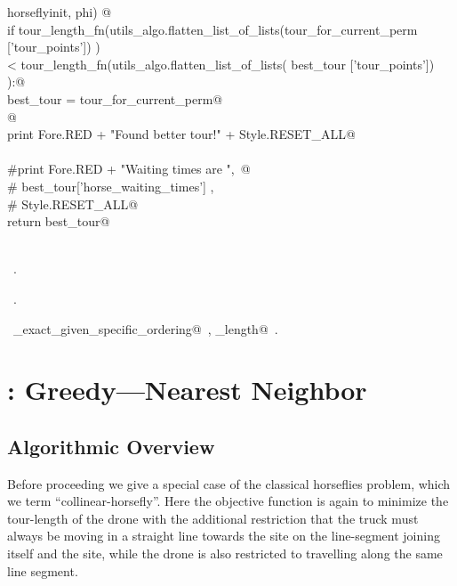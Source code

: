 \documentclass[11.5pt]{report}
\begin{document}
\begin{flushleft}
\begin{minipage}{\linewidth}
\begin{list}{}{}
\mbox{}\verb@                                                                    horseflyinit, phi) @\\
\mbox{}\verb@        if tour_length_fn(utils_algo.flatten_list_of_lists(tour_for_current_perm ['tour_points']) ) \@\\
\mbox{}\verb@         < tour_length_fn(utils_algo.flatten_list_of_lists(            best_tour ['tour_points']) ):@\\
\mbox{}\verb@                best_tour = tour_for_current_perm@\\
\mbox{}\verb@                @\\
\mbox{}\verb@                print Fore.RED + "Found better tour!" + Style.RESET_ALL@\\
\mbox{}\verb@@\\
\mbox{}\verb@    #print Fore.RED + "\nHorse Waiting times are ",\ @\\
\mbox{}\verb@    #       best_tour['horse_waiting_times'] , \@\\
\mbox{}\verb@    #       Style.RESET_ALL@\\
\mbox{}\verb@    return best_tour@\\
\mbox{}\verb@@\\
\mbox{}\verb@@{\NWsep}
\end{list}
\vspace{-1.5ex}
\footnotesize
\begin{list}{}{\setlength{\itemsep}{-\parsep}\setlength{\itemindent}{-\leftmargin}}
\item \NWtxtMacroDefBy\ .
\item \NWtxtMacroRefIn\ .
\item \NWtxtIdentsUsed\nobreak\  \verb@algo_exact_given_specific_ordering@\nobreak\ , \verb@tour_length@\nobreak\ .
\item{}
\end{list}
\end{minipage}\vspace{4ex}
\end{flushleft}
\section{: Greedy---Nearest Neighbor}  
\label{sec:greedy-nn}
\subsection{Algorithmic Overview}
\newchunk Before proceeding we give a special case of the 
          classical horseflies problem, which we term 
         ``collinear-horsefly''. Here the objective function
         is again to minimize the tour-length of the drone
         with the additional restriction that the truck must
     always be moving in a straight line towards the site on the 
line-segment joining itself and the site, while the drone is also 
restricted to travelling along the same line segment. 
\end{document}
